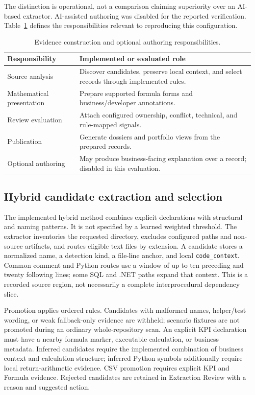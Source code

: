 \documentclass[a4paper,fleqn]{cas-dc}
\begin{document}
The distinction is operational, not a comparison claiming superiority over an AI-based extractor. AI-assisted authoring was disabled for the reported verification. Table~\ref{tab:division} defines the responsibilities relevant to reproducing this configuration.

\begin{table}[!t]
\centering
\caption{Evidence construction and optional authoring responsibilities.}
\label{tab:division}
\begin{tabularx}{\columnwidth}{p{}X}
\toprule
\textbf{Responsibility} & \textbf{Implemented or evaluated role} \\
\midrule
Source analysis & Discover candidates, preserve local context, and select records through implemented rules. \\
Mathematical presentation & Prepare supported formula forms and business/developer annotations. \\
Review evaluation & Attach configured ownership, conflict, technical, and rule-mapped signals. \\
Publication & Generate dossiers and portfolio views from the prepared records. \\
Optional authoring & May produce business-facing explanation over a record; disabled in this evaluation. \\
\bottomrule
\end{tabularx}
\end{table}

\subsection{Hybrid candidate extraction and selection}
\label{sec:extraction}

The implemented hybrid method combines explicit declarations with structural and naming patterns. It is not specified by a learned weighted threshold. The extractor inventories the requested directory, excludes configured paths and non-source artifacts, and routes eligible text files by extension. A candidate stores a normalized name, a detection kind, a file-line anchor, and local \texttt{code\_context}. Common comment and Python routes use a window of up to ten preceding and twenty following lines; some SQL and .NET paths expand that context. This is a recorded source region, not necessarily a complete interprocedural dependency slice.

Promotion applies ordered rules. Candidates with malformed names, helper/test wording, or weak fallback-only evidence are withheld; scenario fixtures are not promoted during an ordinary whole-repository scan. An explicit KPI declaration must have a nearby formula marker, executable calculation, or business metadata. Inferred candidates require the implemented combination of business context and calculation structure; inferred Python symbols additionally require local return-arithmetic evidence. CSV promotion requires explicit KPI and Formula evidence. Rejected candidates are retained in Extraction Review with a reason and suggested action.
\end{document}
